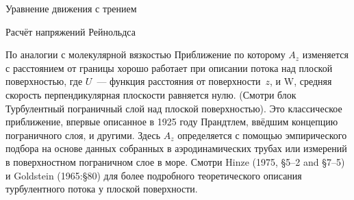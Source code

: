 \begin{chapter}{Уравнение движения с трением}
\begin{section}{Расчёт напряжений Рейнольдса}
\begin{paragraph}{По аналогии с молекулярной вязкостью}
Приближение по которому $A_z$ изменяется с расстоянием от границы хорошо
работает при описании потока над плоской поверхностью, где $U$~---
функция расстояния от поверхности~$z$, и W, средняя скорость
перпендикулярная плоскости равняется нулю. (Смотри блок Турбулентный
пограничный слой над плоской поверхностью). Это классическое
приближение, впервые описанное в 1925 году Прандтлем, ввёдшим
концепцию пограничного слоя, и другими. Здесь $A_z$ определяется с
помощью эмпирического подбора на основе данных собранных в
аэродинамических трубах или измерений в поверхностном пограничном слое
в море. Смотри Hinze (1975, \S5--2 and \S7--5) и Goldstein (1965:\S80) 
для более подробного теоретического описания турбулентного потока
у плоской поверхности.
%


\end{paragraph}
\end{section}
\end{chapter}
